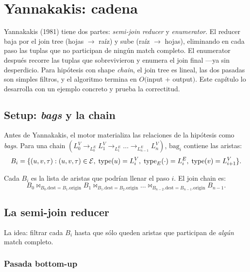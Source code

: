 \chapter{Yannakakis: cadena}
\label{cap:yannakakis-chain}

\begin{intuicion}
Yannakakis (1981) tiene dos partes: \emph{semi-join reducer} y
\emph{enumerator}. El reducer baja por el join tree (hojas $\to$
raíz) y sube (raíz $\to$ hojas), eliminando en cada paso las
tuplas que no participan de ningún match completo. El enumerator
después recorre las tuplas que sobrevivieron y enumera el join
final ---ya sin desperdicio. Para hipótesis con shape \emph{chain},
el join tree es lineal, las dos pasadas son simples filtros, y el
algoritmo termina en \(O(\)input + output\()\). Este capítulo lo
desarrolla con un ejemplo concreto y prueba la correctitud.
\end{intuicion}

\section{Setup: \emph{bags} y la chain}

Antes de Yannakakis, el motor materializa las relaciones de la
hipótesis como \emph{bags}. Para una chain
\((L_0^V \to_{L_0^E} L_1^V \to_{L_1^E} \dots \to_{L_{n-1}^E} L_n^V)\),
\(\mathrm{bag}_i\) contiene las aristas:
\[
B_i = \{(u, v, \tau) : (u, v, \tau) \in \mathcal{E},\;
                     \mathrm{type}(u) = L_i^V,\;
                     \mathrm{type}_E(\cdot) = L_i^E,\;
                     \mathrm{type}(v) = L_{i+1}^V\}.
\]

\noindent
Cada \(B_i\) es la lista de aristas que podrían llenar el paso
\(i\). El join chain es:
\[
B_0 \bowtie_{B_0.\mathrm{dest} = B_1.\mathrm{origin}} B_1
   \bowtie_{B_1.\mathrm{dest} = B_2.\mathrm{origin}} \dots
   \bowtie_{B_{n-2}.\mathrm{dest} = B_{n-1}.\mathrm{origin}} B_{n-1}.
\]

\section{La semi-join reducer}

La idea: filtrar cada \(B_i\) hasta que sólo queden aristas que
participan de \emph{algún} match completo.

\subsection{Pasada bottom-up}

